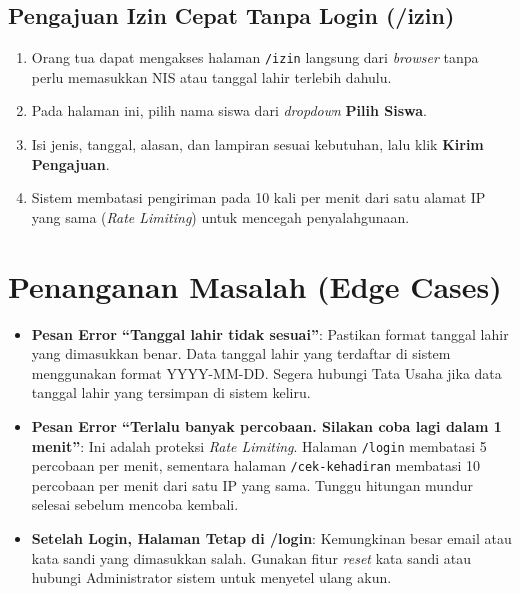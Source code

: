\subsection{Pengajuan Izin Cepat Tanpa Login (/izin)}
\begin{enumerate}
    \item Orang tua dapat mengakses halaman \texttt{/izin} langsung dari \textit{browser} tanpa perlu memasukkan NIS atau tanggal lahir terlebih dahulu.
    \item Pada halaman ini, pilih nama siswa dari \textit{dropdown} \textbf{Pilih Siswa}.
    \item Isi jenis, tanggal, alasan, dan lampiran sesuai kebutuhan, lalu klik \textbf{Kirim Pengajuan}.
    \item Sistem membatasi pengiriman pada 10 kali per menit dari satu alamat IP yang sama (\textit{Rate Limiting}) untuk mencegah penyalahgunaan.
\end{enumerate}

\section{Penanganan Masalah (Edge Cases)}
\begin{itemize}
    \item \textbf{Pesan Error ``Tanggal lahir tidak sesuai''}: Pastikan format tanggal lahir yang dimasukkan benar. Data tanggal lahir yang terdaftar di sistem menggunakan format YYYY-MM-DD. Segera hubungi Tata Usaha jika data tanggal lahir yang tersimpan di sistem keliru.
    \item \textbf{Pesan Error ``Terlalu banyak percobaan. Silakan coba lagi dalam 1 menit''}: Ini adalah proteksi \textit{Rate Limiting}. Halaman \texttt{/login} membatasi 5 percobaan per menit, sementara halaman \texttt{/cek-kehadiran} membatasi 10 percobaan per menit dari satu IP yang sama. Tunggu hitungan mundur selesai sebelum mencoba kembali.
    \item \textbf{Setelah Login, Halaman Tetap di /login}: Kemungkinan besar email atau kata sandi yang dimasukkan salah. Gunakan fitur \textit{reset} kata sandi atau hubungi Administrator sistem untuk menyetel ulang akun.
\end{itemize}
